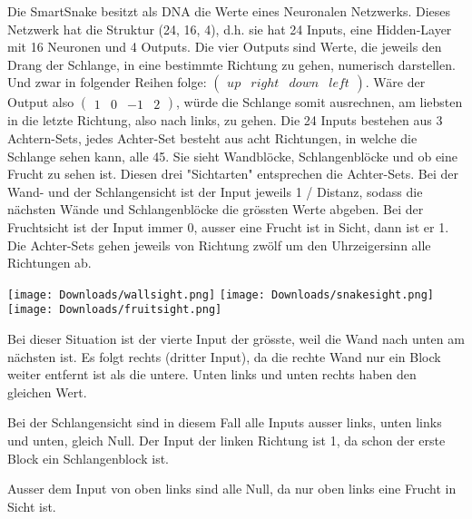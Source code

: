 \documentclass[11pt,a4paper,ngerman]{article}
\begin{document}
Die SmartSnake besitzt als DNA die Werte eines Neuronalen Netzwerks. Dieses Netzwerk hat die Struktur (24, 16, 4), d.h. sie hat 24 Inputs, eine Hidden-Layer mit 16 Neuronen und 4 Outputs. Die vier Outputs sind Werte, die jeweils den Drang der Schlange, in eine bestimmte Richtung zu gehen, numerisch darstellen. Und zwar in folgender Reihen folge: $ \left(\begin{array}{cccc} up & right & down & left\end{array}\right) $. Wäre der Output also $ \left(\begin{array}{cccc} 1 & 0 & -1 & 2\end{array}\right) $, würde die Schlange somit ausrechnen, am liebsten in die letzte Richtung, also nach links, zu gehen. Die 24 Inputs bestehen aus 3 Achtern-Sets, jedes Achter-Set besteht aus acht Richtungen, in welche die Schlange sehen kann, alle 45\degree. Sie sieht Wandblöcke, Schlangenblöcke und ob eine Frucht zu sehen ist. Diesen drei "Sichtarten" entsprechen die Achter-Sets. Bei der Wand- und der Schlangensicht ist der Input jeweils 1 / Distanz, sodass die nächsten Wände und Schlangenblöcke die grössten Werte abgeben. Bei der Fruchtsicht ist der Input immer 0, ausser eine Frucht ist in Sicht, dann ist er 1. Die Achter-Sets gehen jeweils von Richtung zwölf um den Uhrzeigersinn alle Richtungen ab.

\begin{center}
\texttt{[image: Downloads/wallsight.png]}
\texttt{[image: Downloads/snakesight.png]}
\texttt{[image: Downloads/fruitsight.png]}
\end{center}
\begin{multicols}{3}
    Bei dieser Situation ist der vierte Input der grösste, weil die Wand nach unten am nächsten ist. Es folgt rechts (dritter Input), da die rechte Wand nur ein Block weiter entfernt ist als die untere. Unten links und unten rechts haben den gleichen Wert.
    
    \columnbreak
    
    Bei der Schlangensicht sind in diesem Fall alle Inputs ausser links, unten links und unten, gleich Null. Der Input der linken Richtung ist 1, da schon der erste Block ein Schlangenblock ist.

    \columnbreak

    Ausser dem Input von oben links sind alle Null, da nur oben links eine Frucht in Sicht ist. 

\end{multicols}
\end{document}
